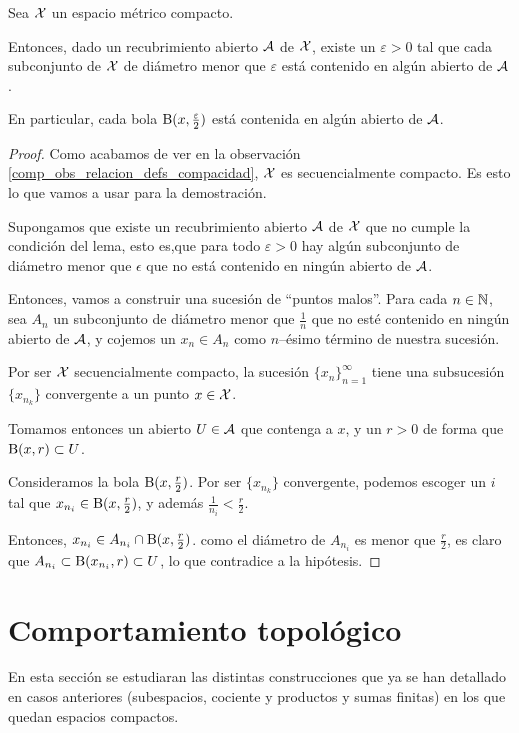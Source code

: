 \begin{lem}[Lebesgue]
	\label{comp_lem_lebesgue}
	Sea $\mathcal{X}$ un espacio métrico compacto.
	
	Entonces, dado un recubrimiento abierto $\mathcal{A}$ de $\mathcal{X}$, existe un $\varepsilon>0$ tal que cada subconjunto de $\mathcal{X}$ de diámetro menor que $\varepsilon$ está contenido en algún abierto de $\mathcal{A}$.
	
	En particular, cada bola $\operatorname{B}(x,\frac{\varepsilon}{2})$ está contenida en algún abierto de $\mathcal{A}$.
\end{lem}
\begin{proof}
	Como acabamos de ver en la observación \ref{comp_obs_relacion_defs_compacidad}, $\mathcal{X}$ es secuencialmente compacto. Es esto lo que vamos a usar para la demostración.
	
	Supongamos que existe un recubrimiento abierto $\mathcal{A}$ de $\mathcal{X}$ que no cumple la condición del lema, esto es,que para todo $\varepsilon > 0$ hay algún subconjunto de diámetro menor que $\epsilon$ que no está contenido en ningún abierto de $\mathcal{A}$.
	
	Entonces, vamos a construir una sucesión de ``puntos malos''. Para cada $n\in\mathbb{N}$, sea $A_n$ un subconjunto de diámetro menor que $\frac{1}{n}$ que no esté contenido en ningún abierto de $\mathcal{A}$, y cojemos un $x_n\in A_n$ como $n$--ésimo término de nuestra sucesión.
	
	Por ser $\mathcal{X}$ secuencialmente compacto, la sucesión $\{x_n\}_{n=1}^\infty$ tiene una subsucesión $\{x_{n_k}\}$ convergente a un punto $x\in\mathcal{X}$.
	
	Tomamos entonces un abierto $U\in\mathcal{A}$ que contenga a $x$, y un $r>0$ de forma que $\operatorname{B}(x,r)\subset U$.
	
	Consideramos la bola $\operatorname{B}(x,\frac{r}{2})$. Por ser $\{x_{n_k}\}$ convergente, podemos escoger un $i$ tal que $x_{n_i}\in\operatorname{B}(x,\frac{r}{2})$, y además  $\frac{1}{n_i}<\frac{r}{2}$.
	
	Entonces, $x_{n_i}\in A_{n_i}\cap\operatorname{B}(x,\frac{r}{2})$. como el diámetro de $A_{n_i}$ es menor que $\frac{r}{2}$, es claro que  $A_{n_i}\subset\operatorname{B}(x_{n_i},r)\subset U$, lo que contradice a la hipótesis.
\end{proof}
\section{Comportamiento topológico}

En esta sección se estudiaran las distintas construcciones que ya se han detallado en casos anteriores (subespacios, cociente y productos y sumas finitas) en los que quedan espacios compactos. 


